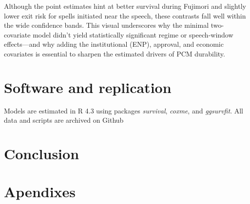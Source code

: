 \documentclass[a4paper, 12pt]{article}
\begin{document}
Although the point estimates hint at better survival during Fujimori and slightly lower exit risk for spells initiated near the speech, these contrasts fall well within the wide confidence bands. This visual underscores why the minimal two-covariate model didn’t yield statistically significant regime or speech-window effects—and why adding the institutional (ENP), approval, and economic covariates is essential to sharpen the estimated drivers of PCM durability.



\section{Software and replication}

Models are estimated in R 4.3 using packages \emph{survival}, \emph{coxme}, and \emph{ggsurvfit}. All data and scripts are archived on Github


\section{Conclusion}

\section{Apendixes}

\renewcommand{\refname}{Bibliography}
\end{document}
